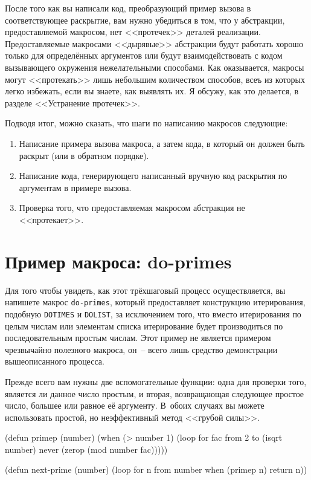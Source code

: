 После того как вы написали код, преобразующий пример вызова в соответствующее раскрытие,
вам нужно убедиться в том, что у абстракции, предоставляемой макросом, нет <<протечек>>
деталей реализации. Предоставляемые макросами <<дырявые>> абстракции будут работать хорошо
только для определённых аргументов или будут взаимодействовать с кодом вызывающего
окружения нежелательными способами. Как оказывается, макросы могут <<протекать>> лишь
небольшим количеством способов, всеъ из которых легко избежать, если вы знаете, как
выявлять их. Я обсужу, как это делается, в разделе <<Устранение протечек>>.

Подводя итог, можно сказать, что шаги по написанию макросов следующие:

\begin{enumerate}
\item Написание примера вызова макроса, а затем кода, в который он должен быть раскрыт
  (или в обратном порядке).
  
\item Написание кода, генерирующего написанный вручную код раскрытия по аргументам в
  примере вызова.

\item Проверка того, что предоставляемая макросом абстракция не <<протекает>>.
\end{enumerate}

\section{Пример макроса: do-primes}

Для того чтобы увидеть, как этот трёхшаговый процесс осуществляется, вы напишете макрос
\lstinline{do-primes}, который предоставляет конструкцию итерирования, подобную
\lstinline{DOTIMES} и \lstinline{DOLIST}, за исключением того, что вместо итерирования по целым
числам или элементам списка итерирование будет производиться по последовательным простым
числам. Этот пример не является примером чрезвычайно полезного макроса, он~-- всего лишь
средство демонстрации вышеописанного процесса.

Прежде всего вам нужны две вспомогательные функции: одна для проверки того, является ли
данное число простым, и вторая, возвращающая следующее простое число, большее или равное
её аргументу. В~обоих случаях вы можете использовать простой, но неэффективный метод
<<грубой силы>>.

\begin{myverb}
(defun primep (number)
  (when (> number 1)
    (loop for fac from 2 to (isqrt number) 
          never (zerop (mod number fac)))))

(defun next-prime (number)
  (loop for n from number when (primep n) return n))
\end{myverb}

